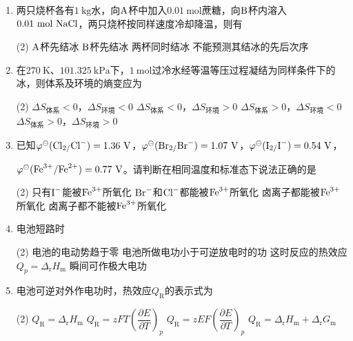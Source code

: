 \begin{enumerate}[label=\arabic*., itemsep=1.5ex]
\begin{tasks}
        \task $k'<k$，$E_\mathrm{a}'<E_\mathrm{a}$
    \end{tasks}
    \item 两只烧杯各有$1\ \mathrm{kg}$水，向$\ce{A}$杯中加入$0.01\ \mathrm{mol}$蔗糖，向$\ce{B}$杯内溶入$0.01\ \mathrm{mol}\ \ce{NaCl}$，两只烧杯按同样速度冷却降温，则有
    \begin{tasks}(2)
        \task $\ce{A}$杯先结冰
        \task $\ce{B}$杯先结冰
        \task 两杯同时结冰
        \task 不能预测其结冰的先后次序
    \end{tasks}
    \item 在$270\ \mathrm{K}$、$101.325\ \mathrm{kPa}$下，$1\ \mathrm{mol}$过冷水经等温等压过程凝结为同样条件下的冰，则体系及环境的熵变应为
    \begin{tasks}(2)
        \task $\Delta S_\text{体系}<0$，$\Delta S_\text{环境}<0$
        \task $\Delta S_\text{体系}<0$，$\Delta S_\text{环境}>0$
        \task $\Delta S_\text{体系}>0$，$\Delta S_\text{环境}<0$
        \task $\Delta S_\text{体系}>0$，$\Delta S_\text{环境}>0$
    \end{tasks}
    \item 已知$\varphi^\ominus(\ce{Cl2/Cl-})=1.36\ \mathrm{V}$，$\varphi^\ominus(\ce{Br2/Br-})=1.07\ \mathrm{V}$，$\varphi^\ominus(\ce{I2/I-})=0.54\ \mathrm{V}$，
    
    $\varphi^\ominus(\ce{Fe^{3+}/Fe^{2+}})=0.77\ \mathrm{V}$。请判断在相同温度和标准态下说法正确的是
    \begin{tasks}(2)
        \task 只有$\ce{I-}$能被$\ce{Fe^{3+}}$所氧化
        \task $\ce{Br-}$和$\ce{Cl-}$都能被$\ce{Fe^{3+}}$所氧化
        \task 卤离子都能被$\ce{Fe^{3+}}$所氧化
        \task 卤离子都不能被$\ce{Fe^{3+}}$所氧化
    \end{tasks}
    \item 电池短路时
    \begin{tasks}(2)
        \task 电池的电动势趋于零
        \task 电池所做电功小于可逆放电时的功
        \task 这时反应的热效应$Q_p=\Delta_\mathrm{r}H_\mathrm{m}$
        \task 瞬间可作极大电功
    \end{tasks}
    \item 电池可逆对外作电功时，热效应$Q_\mathrm{R}$的表示式为
    \begin{tasks}(2)
        \task $Q_\mathrm{R}=\Delta_\mathrm{r}H_\mathrm{m}$
        \task $Q_\mathrm{R}=zFT\left(\dfrac{\partial E}{\partial T}\right)_p$
        \task $Q_\mathrm{R}=zEF\left(\dfrac{\partial E}{\partial T}\right)_p$
        \task $Q_\mathrm{R}=\Delta_\mathrm{r}H_\mathrm{m}+\Delta_\mathrm{r}G_\mathrm{m}$
    \end{tasks}
\end{enumerate}

